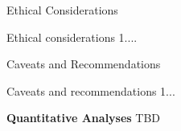 \documentclass{article}
\begin{document}
\begin{adjustwidth}{-60pt}{-30pt}
\begin{singlespace}
\begin{tcolorbox}[title=\textbf{\VAR{pc.metadata.name} : Model Card},
    breakable, sharp corners, boxrule=0.7pt]
\begin{mcsection}{Ethical Considerations}
    \item Ethical considerations 1....
\end{mcsection}

\begin{mcsection}{Caveats and Recommendations}
    \item Caveats and recommendations 1...
\end{mcsection}

\textbf{Quantitative Analyses}
TBD
\end{tcolorbox}
\end{singlespace}
\end{adjustwidth}
\end{document}
